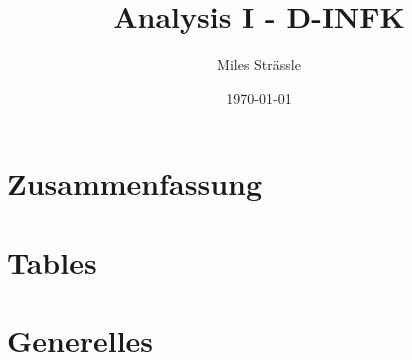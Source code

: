 \documentclass[11pt]{article}
\begin{document}
\title{Analysis I - D-INFK}
\author{Miles Strässle}
\date{\today}
\maketitle

\setcounter{tocdepth}{2}
\setcounter{page}{1}

% 


\part{Zusammenfassung}









\part{Tables}


\part{Generelles}



\end{document}
